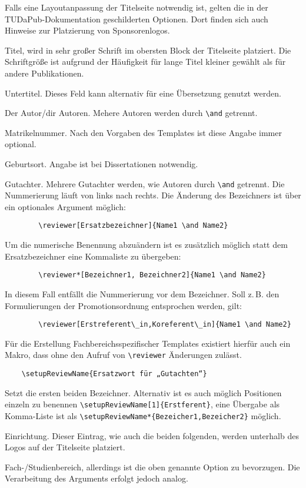\documentclass[
	ngerman,
	ruledheaders=section,%
	class=report,%
	thesis={type=bachelor},%
	accentcolor=9c,%
	custommargins=true,%
	marginpar=false,%
	parskip=half-,%
	fontsize=11pt,%
]{tudapub}
\begin{document}
Falls eine Layoutanpassung der Titelseite notwendig ist, gelten die in der TUDaPub-Dokumentation geschilderten Optionen. Dort finden sich auch Hinweise zur Platzierung von Sponsorenlogos. \cite{tudapub}

\begin{description}
	\item[title] Titel, wird in sehr großer Schrift im obersten Block der Titelseite platziert. Die Schriftgröße ist aufgrund der Häufigkeit für lange Titel kleiner gewählt als für andere Publikationen.
	\item[subtitle] Untertitel. Dieses Feld kann alternativ für eine Übersetzung genutzt werden.
	\item[author] Der Autor/dir Autoren. Mehere Autoren werden durch \verb+\and+ getrennt.
	\item[studentID] Matrikelnummer. Nach den Vorgaben des Templates ist diese Angabe immer optional.
	\item[birthplace] Geburtsort. Angabe ist bei Dissertationen notwendig.
	\item[reviewer] Gutachter. Mehrere Gutachter werden, wie Autoren durch \verb+\and+ getrennt. Die Nummerierung läuft von links nach rechts.
	Die Änderung des Bezeichners ist über ein optionales Argument möglich:
	\begin{verbatim}
		\reviewer[Ersatzbezeichner]{Name1 \and Name2}
	\end{verbatim}
	Um die numerische Benennung abzuändern ist es zusätzlich möglich statt dem Ersatzbezeichner eine Kommaliste zu übergeben:
	\begin{verbatim}
		\reviewer*[Bezeichner1, Bezeichner2]{Name1 \and Name2}
	\end{verbatim}
	In diesem Fall entfällt die Nummerierung vor dem Bezeichner. Soll z.\,B. den Formulierungen der Promotionsordnung entsprochen werden, gilt:
	\begin{verbatim}
		\reviewer[Erstreferent\_in,Koreferent\_in]{Name1 \and Name2}
	\end{verbatim}
	Für die Erstellung Fachbereichsspezifischer Templates existiert hierfür auch ein Makro, dass ohne den Aufruf von \verb+\reviewer+ Änderungen zulässt.
	\begin{verbatim}
	\setupReviewName{Ersatzwort für „Gutachten“}
	\end{verbatim}
	Setzt die ersten beiden Bezeichner. Alternativ ist es auch möglich Positionen einzeln zu benennen \verb+\setupReviewName[1]{Erstferent}+, eine Übergabe als Komma-Liste ist als \verb+\setupReviewName*{Bezeicher1,Bezeicher2}+ möglich.
	\item[institution] Einrichtung. Dieser Eintrag, wie auch die beiden folgenden, werden unterhalb des Logos auf der Titelseite platziert.
	\item[department] Fach-/Studienbereich, allerdings ist die oben genannte Option zu bevorzugen. Die Verarbeitung des Arguments erfolgt jedoch analog.


\end{description}
\end{document}

